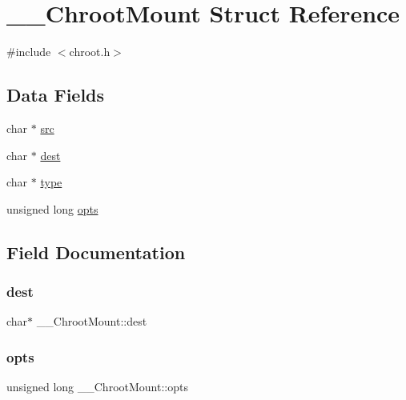 \hypertarget{struct_____chroot_mount}{}\section{\+\_\+\+\_\+\+Chroot\+Mount Struct Reference}
\label{struct_____chroot_mount}


{\ttfamily \#include $<$chroot.\+h$>$}

\subsection*{Data Fields}
\begin{DoxyCompactItemize}
\item 
char $\ast$ \mbox{\hyperlink{struct_____chroot_mount_a1853f747ee2cf7e6e33d34d8c5d598d6}{src}}
\item 
char $\ast$ \mbox{\hyperlink{struct_____chroot_mount_a03470e5202cc10763f9260fac2781aed}{dest}}
\item 
char $\ast$ \mbox{\hyperlink{struct_____chroot_mount_a184d760509dc0e1b485124d2f31d6889}{type}}
\item 
unsigned long \mbox{\hyperlink{struct_____chroot_mount_a301ce607b0f62e7c5cc1caed898e6b93}{opts}}
\end{DoxyCompactItemize}


\subsection{Field Documentation}
\mbox{\label{struct_____chroot_mount_a03470e5202cc10763f9260fac2781aed}} 
\subsubsection{\texorpdfstring{dest}{dest}}
{\footnotesize\ttfamily char$\ast$ \+\_\+\+\_\+\+Chroot\+Mount\+::dest}

\mbox{\label{struct_____chroot_mount_a301ce607b0f62e7c5cc1caed898e6b93}} 
\subsubsection{\texorpdfstring{opts}{opts}}
{\footnotesize\ttfamily unsigned long \+\_\+\+\_\+\+Chroot\+Mount\+::opts}

